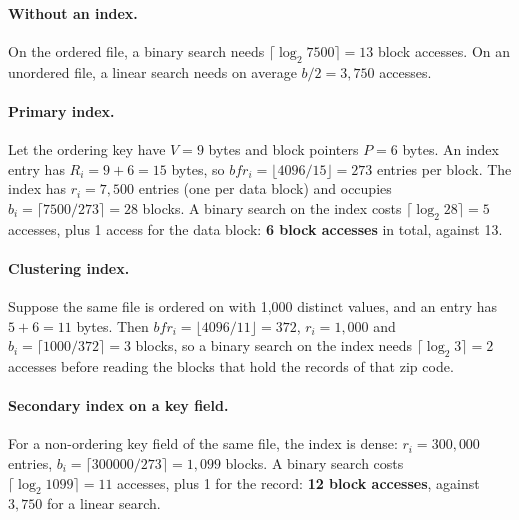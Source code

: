 \paragraph{Without an index.} On the ordered file, a binary search needs
$\lceil \log_2 7500 \rceil = 13$ block accesses. On an unordered file, a linear search needs on
average $b/2 = 3{,}750$ accesses.

\paragraph{Primary index.} Let the ordering key have $V = 9$ bytes and block pointers $P = 6$
bytes. An index entry has $R_i = 9 + 6 = 15$ bytes, so
$bfr_i = \lfloor 4096/15 \rfloor = 273$ entries per block. The index has $r_i = 7{,}500$ entries
(one per data block) and occupies $b_i = \lceil 7500/273 \rceil = 28$ blocks. A binary search on the
index costs $\lceil \log_2 28 \rceil = 5$ accesses, plus 1 access for the data block:
\textbf{6 block accesses} in total, against 13.

\paragraph{Clustering index.} Suppose the same file is ordered on  with 1{,}000
distinct values, and an entry has $5 + 6 = 11$ bytes. Then $bfr_i = \lfloor 4096/11 \rfloor = 372$,
$r_i = 1{,}000$ and $b_i = \lceil 1000/372 \rceil = 3$ blocks, so a binary search on the index needs
$\lceil \log_2 3 \rceil = 2$ accesses before reading the blocks that hold the records of that
zip code.

\paragraph{Secondary index on a key field.} For a non-ordering key field of the same file, the
index is dense: $r_i = 300{,}000$ entries, $b_i = \lceil 300000/273 \rceil = 1{,}099$ blocks. A
binary search costs $\lceil \log_2 1099 \rceil = 11$ accesses, plus 1 for the record:
\textbf{12 block accesses}, against $3{,}750$ for a linear search.

